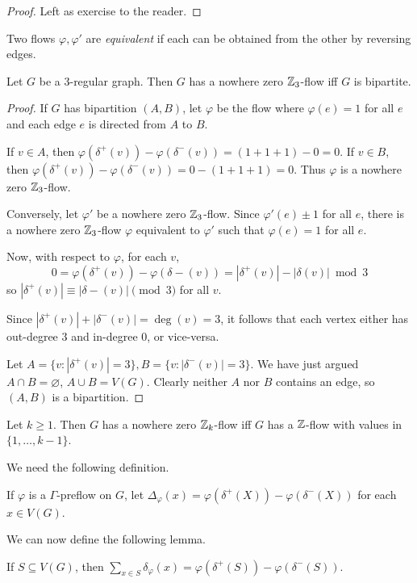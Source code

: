 \documentclass[main.tex]{subfiles}
\begin{document}
\begin{proof}
  Left as exercise to the reader.
\end{proof}
Two flows $\varphi, \varphi'$ are \textit{equivalent} if each can be obtained
from the other by reversing edges.
\begin{proposition*}
  Let $G$ be a 3-regular graph.
  Then $G$ has a nowhere zero $\mathbb Z_3$-flow iff $G$ is bipartite.
\end{proposition*}
\begin{proof}
  If $G$ has bipartition $(A,B)$, let $\varphi$ be the flow where
  $\varphi(e) = 1$ for all $e$ and each edge $e$ is directed from $A$ to $B$.

  If $v\in A$, then $\varphi(\delta^+(v)) - \varphi(\delta^-(v)) = (1 + 1 + 1) - 0 = 0$.
  If $v\in B$, then $\varphi(\delta^+(v)) - \varphi(\delta^-(v)) = 0 - (1+1+1) = 0$.
  Thus $\varphi$ is a nowhere zero $\mathbb Z_3$-flow.

  Conversely, let $\varphi'$ be a nowhere zero $\mathbb Z_3$-flow.
  Since $\varphi'(e)  \pm 1$ for all $e$, there is a nowhere zero $\mathbb Z_3$-flow
  $\varphi$ equivalent to $\varphi'$ such that $\varphi(e) = 1$ for all $e$.

  Now, with respect to $\varphi$, for each $v$,
  \[
    0 = \varphi(\delta^+(v)) - \varphi(\delta-(v)) = |\delta^+(v)| - |\delta(v)|\bmod 3
  \]
  so $|\delta^+(v)|\equiv|\delta-(v)|\pmod 3$ for all $v$.

  Since $|\delta^+(v)| + |\delta^-(v)| = \deg(v) = 3$, it follows that each
  vertex either has out-degree 3 and in-degree 0, or vice-versa.

  Let $A = \{v : |\delta^+(v)| = 3\}, B = \{v : |\delta^-(v)| = 3\}$.
  We have just argued $A\cap B = \varnothing$, $A\cup B = V(G)$.
  Clearly neither $A$ nor $B$ contains an edge, so $(A,B)$ is a bipartition.
\end{proof}
\begin{theorem}[Tutte]
  Let $k\geq 1$.
  Then $G$ has a nowhere zero $\mathbb Z_k$-flow iff $G$ has a $\mathbb Z$-flow with values
  in $\{1,\ldots,k-1\}$.
\end{theorem}
We need the following definition.
\begin{definition*}
  If $\varphi$ is a $\Gamma$-preflow on $G$, let
  $\Delta_\varphi(x) = \varphi(\delta^+(X)) - \varphi(\delta^-(X))$
  for each $x\in V(G)$.
\end{definition*}
We can now define the following lemma.
\begin{lemma}
  If $S\subseteq V(G)$, then
  $\sum_{x\in S}\delta_\varphi(x) = \varphi(\delta^+(S)) - \varphi(\delta^-(S))$.
\end{lemma}
\end{document}
